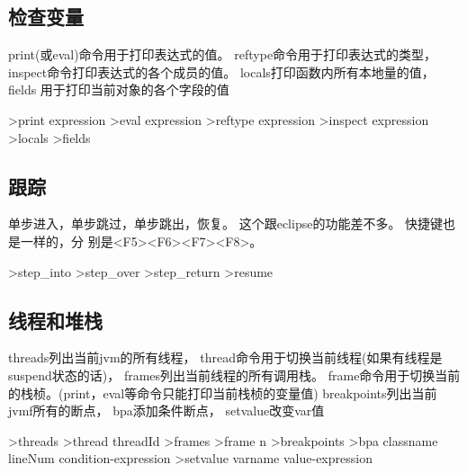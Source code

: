 \documentclass[oneside,openany]{book}
\begin{document}
  \subsection{检查变量}
    print(或eval)命令用于打印表达式的值。 reftype命令用于打印表达式的类型，
  inspect命令打印表达式的各个成员的值。 locals打印函数内所有本地量的值， fields
  用于打印当前对象的各个字段的值
    \begin{mdframed}[style=SmallFrame]
      \begin{flushleft}
      >print expression\newline
      >eval expression\newline
      >reftype expression\newline                      
      >inspect expression\newline                      
      >locals\newline                      
      >fields
      \end{flushleft}
    \end{mdframed}

  \subsection{跟踪}

    单步进入，单步跳过，单步跳出，恢复。 这个跟eclipse的功能差不多。 快捷键也是一样的，分
    别是<F5><F6><F7><F8>。
    \begin{mdframed}[style=SmallFrame]
      \begin{flushleft}
      >step\_into\newline
      >step\_over\newline
      >step\_return\newline
      >resume           
      \end{flushleft}
    \end{mdframed}

    

  \subsection{线程和堆栈}
  threads列出当前jvm的所有线程， thread命令用于切换当前线程(如果有线程是suspend状态的话)，
  frames列出当前线程的所有调用栈。 frame命令用于切换当前的栈桢。(print，eval等命令只能打印当前栈桢的变量值)
  breakpoints列出当前jvmf所有的断点， bpa添加条件断点， setvalue改变var值
    \begin{mdframed}[style=SmallFrame]
      \begin{flushleft}
      >threads\newline
      >thread threadId\newline
      >frames\newline
      >frame n\newline
      >breakpoints\newline
      >bpa classname lineNum condition-expression\newline
      >setvalue  varname value-expression\newline
      \end{flushleft}
    \end{mdframed}
\end{document}
